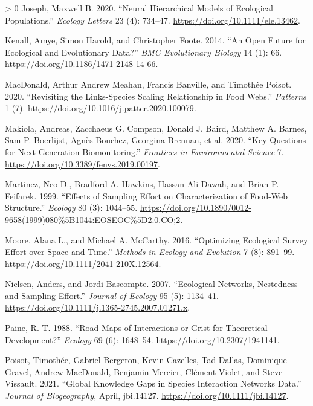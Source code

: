\documentclass[10pt,oneside]{article}
\newlength{\cslhangindent}
\newenvironment{CSLReferences}[3] %
 {%
  \setlength{\parindent}{0pt}
  \ifodd #1 \everypar{\setlength{\hangindent}{\cslhangindent}}\ignorespaces\fi
  \ifnum #2 > 0
  \setlength{\parskip}{#2\baselineskip}
  \fi
 }%
 {}
\begin{document}
\begin{CSLReferences}{1}{0}
\leavevmode\hypertarget{ref-Joseph2020NeuHie}{}%
Joseph, Maxwell B. 2020. {``Neural Hierarchical Models of Ecological
Populations.''} \emph{Ecology Letters} 23 (4): 734--47.
\url{https://doi.org/10.1111/ele.13462}.

\leavevmode\hypertarget{ref-Kenall2014OpeFut}{}%
Kenall, Amye, Simon Harold, and Christopher Foote. 2014. {``An Open
Future for Ecological and Evolutionary Data?''} \emph{BMC Evolutionary
Biology} 14 (1): 66. \url{https://doi.org/10.1186/1471-2148-14-66}.

\leavevmode\hypertarget{ref-MacDonald2020RevLin}{}%
MacDonald, Arthur Andrew Meahan, Francis Banville, and Timothée Poisot.
2020. {``Revisiting the Links-Species Scaling Relationship in Food
Webs.''} \emph{Patterns} 1 (7).
\url{https://doi.org/10.1016/j.patter.2020.100079}.

\leavevmode\hypertarget{ref-Makiola2020KeyQue}{}%
Makiola, Andreas, Zacchaeus G. Compson, Donald J. Baird, Matthew A.
Barnes, Sam P. Boerlijst, Agnès Bouchez, Georgina Brennan, et al. 2020.
{``Key Questions for Next-Generation Biomonitoring.''} \emph{Frontiers
in Environmental Science} 7.
\url{https://doi.org/10.3389/fenvs.2019.00197}.

\leavevmode\hypertarget{ref-Martinez1999EffSam}{}%
Martinez, Neo D., Bradford A. Hawkins, Hassan Ali Dawah, and Brian P.
Feifarek. 1999. {``Effects of Sampling Effort on Characterization of
Food-Web Structure.''} \emph{Ecology} 80 (3): 1044--55.
\url{https://doi.org/10.1890/0012-9658(1999)080\%5B1044:EOSEOC\%5D2.0.CO;2}.

\leavevmode\hypertarget{ref-Moore2016OptEco}{}%
Moore, Alana L., and Michael A. McCarthy. 2016. {``Optimizing Ecological
Survey Effort over Space and Time.''} \emph{Methods in Ecology and
Evolution} 7 (8): 891--99.
\url{https://doi.org/10.1111/2041-210X.12564}.

\leavevmode\hypertarget{ref-Nielsen2007EcoNet}{}%
Nielsen, Anders, and Jordi Bascompte. 2007. {``Ecological Networks,
Nestedness and Sampling Effort.''} \emph{Journal of Ecology} 95 (5):
1134--41. \url{https://doi.org/10.1111/j.1365-2745.2007.01271.x}.

\leavevmode\hypertarget{ref-Paine1988RoaMap}{}%
Paine, R. T. 1988. {``Road Maps of Interactions or Grist for Theoretical
Development?''} \emph{Ecology} 69 (6): 1648--54.
\url{https://doi.org/10.2307/1941141}.

\leavevmode\hypertarget{ref-Poisot2021GloKno}{}%
Poisot, Timothée, Gabriel Bergeron, Kevin Cazelles, Tad Dallas,
Dominique Gravel, Andrew MacDonald, Benjamin Mercier, Clément Violet,
and Steve Vissault. 2021. {``Global Knowledge Gaps in Species
Interaction Networks Data.''} \emph{Journal of Biogeography}, April,
jbi.14127. \url{https://doi.org/10.1111/jbi.14127}.


\end{CSLReferences}
\end{document}
